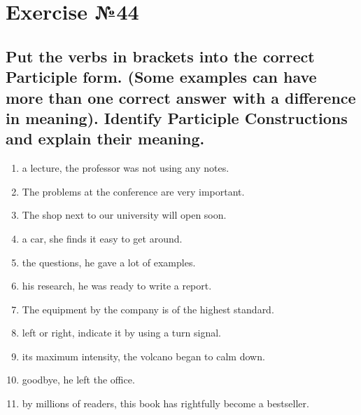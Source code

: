 \section{Exercise №44}
\subsection*{ Put the verbs in brackets into the correct Participle form. (Some examples can have more
      than one correct answer with a difference in meaning). Identify Participle Constructions and
      explain their meaning.}
\begin{enumerate}
      \item \underline{\hspace{1.5cm}} a lecture, the professor was not using any notes.
      \item The problems \underline{\hspace{1.5cm}} at the conference are very important.
      \item The shop \underline{\hspace{1.5cm}} next to our university will open soon.
      \item \underline{\hspace{1.5cm}} a car, she finds it easy to get around.
      \item \underline{\hspace{1.5cm}} the questions, he gave a lot of examples.
      \item \underline{\hspace{1.5cm}} his research, he was ready to write a report.
      \item The equipment \underline{\hspace{1.5cm}} by the company is of the highest standard.
      \item \underline{\hspace{1.5cm}} left or right, indicate it by using a turn signal.
      \item \underline{\hspace{1.5cm}} its maximum intensity, the volcano began to calm down.
      \item \underline{\hspace{1.5cm}} goodbye, he left the office.
      \item \underline{\hspace{1.5cm}} by millions of readers, this book has rightfully become a bestseller.
\end{enumerate}

